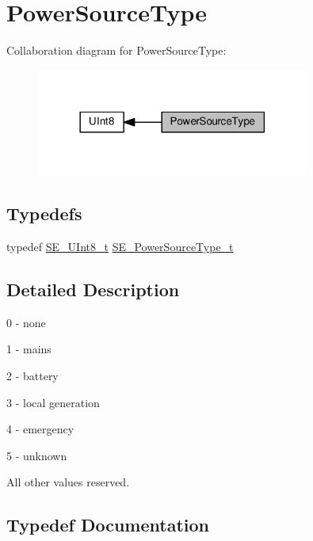 \hypertarget{group__PowerSourceType}{}\section{Power\+Source\+Type}
\label{group__PowerSourceType}
Collaboration diagram for Power\+Source\+Type\+:\nopagebreak
\begin{figure}[H]
\begin{center}
\leavevmode
\includegraphics[width=254pt]{group__PowerSourceType}
\end{center}
\end{figure}
\subsection*{Typedefs}
\begin{DoxyCompactItemize}
\item 
typedef \hyperlink{group__UInt8_gaf7c365a1acfe204e3a67c16ed44572f5}{S\+E\+\_\+\+U\+Int8\+\_\+t} \hyperlink{group__PowerSourceType_ga196e6e180c5421a97062704daa6a96fc}{S\+E\+\_\+\+Power\+Source\+Type\+\_\+t}
\end{DoxyCompactItemize}


\subsection{Detailed Description}
0 -\/ none

1 -\/ mains

2 -\/ battery

3 -\/ local generation

4 -\/ emergency

5 -\/ unknown

All other values reserved. 

\subsection{Typedef Documentation}
\mbox{\label{group__PowerSourceType_ga196e6e180c5421a97062704daa6a96fc}} 
